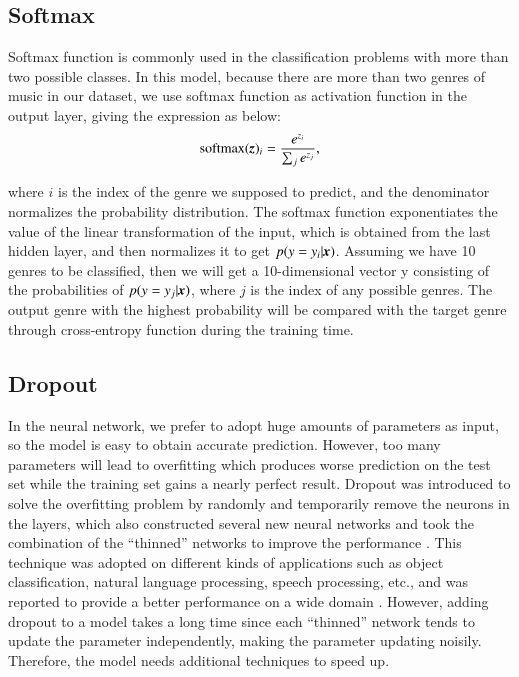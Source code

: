 \documentclass{article}
\def\mathbi#1{\textbf{\em #1}}
\begin{document}
\subsection{Softmax}
Softmax function is commonly used in the classification problems with more than two possible classes. In this model, because there are more than two genres of music in our dataset, we use softmax function as activation function in the output layer, giving the expression as below:
\begin{equation}
	\mathrm{softmax}(\mathbi{z})_i=\frac{e^{z_i}}{\sum_j e^{z_j}},
\end{equation}

where $i$ is the index of the genre we supposed to predict, and the denominator normalizes the probability distribution. The softmax function exponentiates the value of the linear transformation of the input, which is obtained from the last hidden layer, and then normalizes it to get ${p(y=y_i|\mathbi{x})}$. Assuming we have 10 genres to be classified, then we will get a 10-dimensional vector y consisting of the probabilities of $p(y=y_j|\mathbi{x})$, where $j$ is the index of any possible genres. The output genre with the highest probability will be compared with the target genre through cross-entropy function during the training time.

\subsection{Dropout}
In the neural network, we prefer to adopt huge amounts of parameters as input, so the model is easy to obtain accurate prediction. However, too many parameters will lead to overfitting which produces worse prediction on the test set while the training set gains a nearly perfect result. Dropout was introduced to solve the overfitting problem by randomly and temporarily remove the neurons in the layers, which also constructed several new neural networks and took the combination of the “thinned” networks to improve the performance \cite{ srivastava2014dropout}. This technique was adopted on different kinds of applications such as object classification, natural language processing, speech processing, etc., and was reported to provide a better performance on a wide domain \cite{srivastava2014dropout}. However, adding dropout to a model takes a long time since each “thinned” network tends to update the parameter independently, making the parameter updating noisily. Therefore, the model needs additional techniques to speed up.
\end{document}
